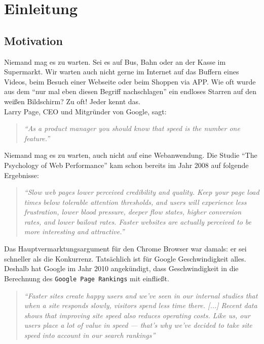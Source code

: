 \setcounter{page}{1}

\section{Einleitung} %
\label{sec:einleitung}

	\subsection{Motivation} %
	\label{sub:motivation}

		Niemand mag es zu warten. Sei es auf Bus, Bahn oder an der Kasse im Supermarkt. Wir warten auch nicht gerne im Internet auf das Buffern eines Videos, beim Besuch einer Webseite oder beim Shoppen via APP. Wie oft wurde aus dem "`nur mal eben diesen Begriff nachschlagen"' ein endloses Starren auf den weißen Bildschirm? Zu oft! Jeder kennt das.\\

		Larry Page, CEO und Mitgründer von Google, sagt:
		\begin{quote}
			\textit{"`As a product manager you should know that speed is the number one feature."'}\autocite{holzle10}
		\end{quote}
		Niemand mag es zu warten, auch nicht auf eine Webanwendung. Die Studie "`The Psychology of Web Performance"' kam schon bereits im Jahr 2008 auf folgende Ergebnisse:

		\begin{quote}\itshape
			"`Slow web pages lower perceived credibility and quality. Keep your page load times below tolerable attention thresholds, and users will experience less frustration, lower blood pressure, deeper flow states, higher conversion rates, and lower bailout rates. Faster websites are actually perceived to be more interesting and attractive."' \autocite{webOpti08}
		\end{quote}

		Das Hauptvermarktungsargument für den Chrome Browser war damals: er sei schneller als die Konkurrenz. Tatsächlich ist für Google Geschwindigkeit alles. Deshalb hat Google im Jahr 2010 angekündigt, dass Geschwindigkeit in die Berechnung des \texttt{Google Page Rankings} mit einfließt.

		\begin{quote}\itshape
			"`Faster sites create happy users and we've seen in our internal studies that when a site responds slowly, visitors spend less time there. [...] Recent data shows that improving site speed also reduces operating costs. Like us, our users place a lot of value in speed — that's why we've decided to take site speed into account in our search rankings"'\autocite{google10}
		\end{quote}

